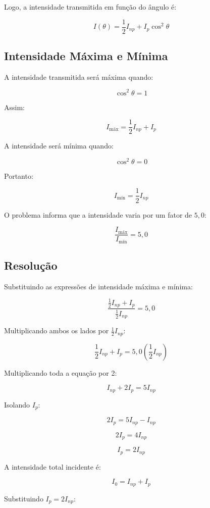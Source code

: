\documentclass[12pt,a4paper]{article}
\begin{document}
Logo, a intensidade transmitida em função do ângulo é:

\[
I(\theta) = \frac{1}{2}I_{np} + I_p\cos^2\theta
\]


\subsection*{Intensidade Máxima e Mínima}

A intensidade transmitida será máxima quando:

\[
\cos^2\theta = 1
\]

Assim:

\[
I_{\text{máx}} = \frac{1}{2}I_{np} + I_p
\]

A intensidade será mínima quando:

\[
\cos^2\theta = 0
\]

Portanto:

\[
I_{\text{mín}} = \frac{1}{2}I_{np}
\]

O problema informa que a intensidade varia por um fator de $5,0$:

\[
\frac{I_{\text{máx}}}{I_{\text{mín}}} = 5,0
\]


\subsection*{Resolução}

Substituindo as expressões de intensidade máxima e mínima:

\[
\frac{
\frac{1}{2}I_{np} + I_p
}{
\frac{1}{2}I_{np}
}
= 5,0
\]

Multiplicando ambos os lados por $\frac{1}{2}I_{np}$:

\[
\frac{1}{2}I_{np} + I_p
=
5,0\left(\frac{1}{2}I_{np}\right)
\]

Multiplicando toda a equação por 2:

\[
I_{np} + 2I_p = 5I_{np}
\]

Isolando $I_p$:

\[
2I_p = 5I_{np} - I_{np}
\]

\[
2I_p = 4I_{np}
\]

\[
I_p = 2I_{np}
\]

A intensidade total incidente é:

\[
I_0 = I_{np} + I_p
\]

Substituindo $I_p = 2I_{np}$:
\end{document}
